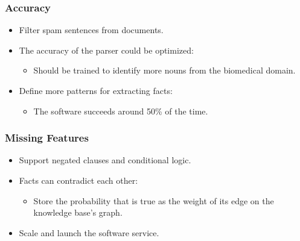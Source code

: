 \documentclass[mathserif]{beamer}
\begin{document}
\begin{frame}

\frametitle{Accuracy}

\begin{itemize}[<+->]

\item Filter spam sentences from documents.

\item The accuracy of the parser could be optimized:
\begin{itemize}[<+->]

\item Should be trained to identify more nouns from the biomedical
domain.

\end{itemize}

\item Define more patterns for extracting facts:
\begin{itemize}[<+->]

\item The software succeeds around 50\% of the time.

\end{itemize}

\end{itemize}

\end{frame}

\begin{frame}

\frametitle{Missing Features}

\begin{itemize}[<+->]

\item Support negated clauses and conditional logic.

\item Facts can contradict each other:
\begin{itemize}[<+->]
\item Store the probability that is true as the weight of its edge on the
knowledge base's graph.
\end{itemize}

\item Scale and launch the software service.

\end{itemize}

\end{frame}
\end{document}
